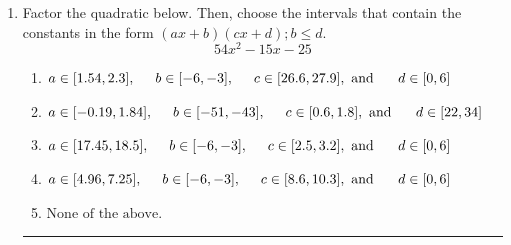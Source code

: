 \documentclass[14pt]{extbook}
\newcommand{\litem}[1]{\item#1\hspace*{-1cm}\rule{\textwidth}{0.4pt}}
\begin{document}
\begin{enumerate}
\litem{
Factor the quadratic below. Then, choose the intervals that contain the constants in the form $(ax+b)(cx+d); b \leq d.$\[ 54x^{2} -15 x -25 \]\begin{enumerate}[label=\Alph*.]
\item \( a \in [1.54, 2.3], \hspace*{5mm} b \in [-6, -3], \hspace*{5mm} c \in [26.6, 27.9], \text{ and } \hspace*{5mm} d \in [0, 6] \)
\item \( a \in [-0.19, 1.84], \hspace*{5mm} b \in [-51, -43], \hspace*{5mm} c \in [0.6, 1.8], \text{ and } \hspace*{5mm} d \in [22, 34] \)
\item \( a \in [17.45, 18.5], \hspace*{5mm} b \in [-6, -3], \hspace*{5mm} c \in [2.5, 3.2], \text{ and } \hspace*{5mm} d \in [0, 6] \)
\item \( a \in [4.96, 7.25], \hspace*{5mm} b \in [-6, -3], \hspace*{5mm} c \in [8.6, 10.3], \text{ and } \hspace*{5mm} d \in [0, 6] \)
\item \( \text{None of the above.} \)


\end{enumerate}}
\end{enumerate}
\end{document}
